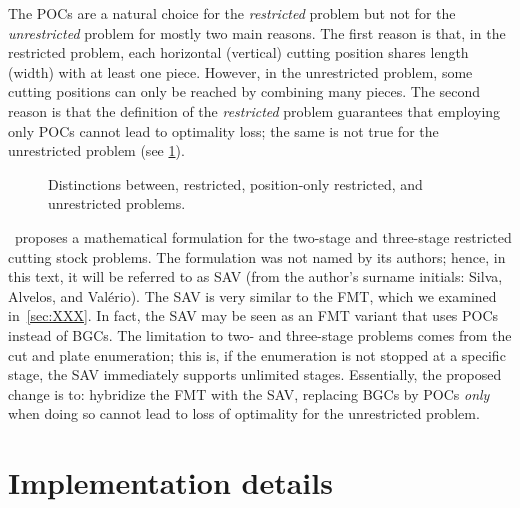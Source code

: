 \documentclass[ppgc,tese,english,formais,babel]{iiufrgs}
\begin{document}
The POCs are a natural choice for the \emph{restricted} problem but not for the \emph{unrestricted} problem for mostly two main reasons.
The first reason is that, in the restricted problem, each horizontal (vertical) cutting position shares length (width) with at least one piece.
However, in the unrestricted problem, some cutting positions can only be reached by combining many pieces.
The second reason is that the definition of the \emph{restricted} problem guarantees that employing only POCs cannot lead to optimality loss; the same is not true for the unrestricted problem (see \cref{fig:distinctions_restricted_unrestricted}).

\begin{figure}[h]
  \caption{Distinctions between, restricted, position-only restricted, and unrestricted problems.}
  \center
  
  \label{fig:distinctions_restricted_unrestricted}
\end{figure}

\cite{silva:2010}~proposes a mathematical formulation for the two-stage and three-stage restricted cutting stock problems.
The formulation was not named by its authors; hence, in this text, it will be referred to as SAV (from the author's surname initials: Silva, Alvelos, and Valério).
The SAV is very similar to the FMT, which we examined in~\cref{sec:XXX}.
In fact, the SAV may be seen as an FMT variant that uses POCs instead of BGCs.
The limitation to two- and three-stage problems comes from the cut and plate enumeration; this is, if the enumeration is not stopped at a specific stage, the SAV immediately supports unlimited stages.
Essentially, the proposed change is to: hybridize the FMT with the SAV, replacing BGCs by POCs \emph{only} when doing so cannot lead to loss of optimality for the unrestricted problem.

\section{Implementation details}
\end{document}
